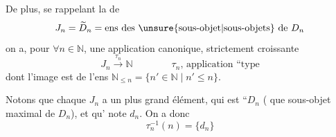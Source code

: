 De plus, se rappelant la  de
\[
 J_n=\widetilde D_n=\text{ens des \unsure{sous-objet|sous-objets} de }D_n
\]
on a, pour \(\forall n\in\mathbb N\), une application canonique, strictement croissante
\[
 J_n\xrightarrow{\tau_n}\mathbb N \qquad\qquad
 \text{\(\tau_n\), application ``type}
\]
dont l'image est   de l'ens
 \(\mathbb N_{\leq n}=\{n'\in\mathbb N\mid n'\leq n\}\).

Notons que chaque \(J_n\) a un plus grand élément, qui est ``\(D_n\) ( que  sous-objet maximal de \(D_n\)), et qu' note \(d_n\). On a donc 
\[
 \tau_n^{-1}(n)=\{d_n\}
\]

